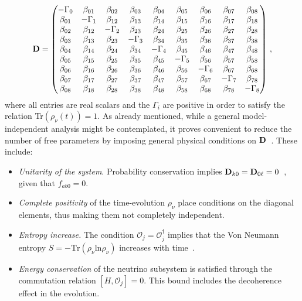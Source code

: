 \documentclass[aps, prd, onecolumn, tightenlines, notitlepage, superscriptaddress, nofootinbib, preprintnumbers, floatfix,showkeys,11pt]{revtex4-2}
\begin{document}
\begin{equation}
\label{eq:Dmatrixfull}
\bf{D}=
\begin{pmatrix}
-\Gamma_{0} & \beta_{01} & \beta_{02} & \beta_{03} & \beta_{04} & \beta_{05} & \beta_{06} & \beta_{07} & \beta_{08} \\ 
\beta_{01} & -\Gamma_{1} & \beta_{12} & \beta_{13} & \beta_{14} & \beta_{15} & \beta_{16} & \beta_{17} & \beta_{18} \\ 
\beta_{02} & \beta_{12} & -\Gamma_{2} & \beta_{23} & \beta_{24} & \beta_{25} & \beta_{26} & \beta_{27} & \beta_{28} \\ 
\beta_{03} & \beta_{13} & \beta_{23} & -\Gamma_{3} & \beta_{34} & \beta_{35} & \beta_{36} & \beta_{37} & \beta_{38} \\ 
\beta_{04} & \beta_{14} & \beta_{24} & \beta_{34} & -\Gamma_{4} & \beta_{45} & \beta_{46} & \beta_{47} & \beta_{48} \\ 
\beta_{05} & \beta_{15} & \beta_{25} & \beta_{35} & \beta_{45} & -\Gamma_{5} & \beta_{56} & \beta_{57} & \beta_{58} \\ 
\beta_{06} & \beta_{16} & \beta_{26} & \beta_{36} & \beta_{46} & \beta_{56} & -\Gamma_{6} & \beta_{67} & \beta_{68} \\ 
\beta_{07} & \beta_{17} & \beta_{27} & \beta_{37} & \beta_{47} & \beta_{57} & \beta_{67} & -\Gamma_{7} & \beta_{78} \\ 
\beta_{08} & \beta_{18} & \beta_{28} & \beta_{38} & \beta_{48} & \beta_{58} & \beta_{68} & \beta_{78} & -\Gamma_{8} \\
\end{pmatrix}\,,
\end{equation}	
%
where all entries are real scalars and the $\Gamma_i$  are positive in order to satisfy the relation Tr$(\rho_\nu(t))= 1$.
As already mentioned, while a general model-independent analysis might be contemplated, it proves convenient to reduce the number of free parameters by imposing general physical conditions on $\bf{D}$~\cite{Lisi:2000zt,Benatti:2000ph,Gago:2002na,Oliveira:2010zzd,BalieiroGomes:2018gtd,Stuttard:2020qfv}. These include:
\begin{itemize}
    \item \textit{Unitarity of the system}.  Probability conservation implies ${\bf{D}}_{k0} =  {\bf{D}}_{0\ell}= 0$~\cite{Buoninfante:2020iyr}, given that $f_{ab0} = 0$.
    \item \textit{Complete positivity} of the time-evolution $\rho_\nu$ place conditions on the diagonal elements, thus making them not completely independent.
    \item  \textit{Entropy increase.} The condition $\mathcal{O}_j = \mathcal{O}_j^\dagger$ implies that the Von Neumann entropy $S = -\mathrm{Tr}(\rho_\nu \mathrm{ln}\rho_\nu)$ increases with time~\cite{Benatti:1987dz}.
    \item \textit{Energy conservation} of the neutrino subsystem is satisfied through the commutation relation $[H,\mathcal{O}_j] = 0$. This bound includes the decoherence effect in the evolution.
\end{itemize}
\end{document}

